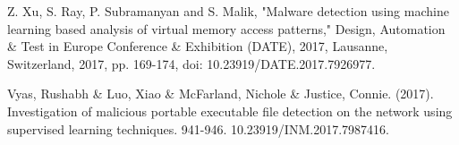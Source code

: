 \documentclass{article}
\begin{document}
\begin{thebibliography}{9}
Z. Xu, S. Ray, P. Subramanyan and S. Malik, "Malware detection using machine learning based analysis of virtual memory access patterns," Design, Automation \& Test in Europe Conference \& Exhibition (DATE), 2017, Lausanne, Switzerland, 2017, pp. 169-174, doi: 10.23919/DATE.2017.7926977. 

Vyas, Rushabh \& Luo, Xiao \& McFarland, Nichole \& Justice, Connie. (2017). Investigation of malicious portable executable file detection on the network using supervised learning techniques. 941-946. 10.23919/INM.2017.7987416. 

\end{thebibliography}
\end{document}
